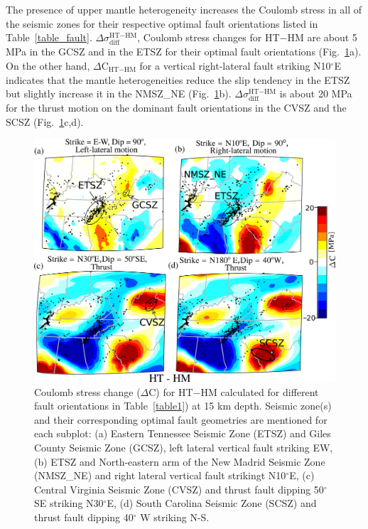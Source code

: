 \documentclass[draft,linenumbers]{agujournal2018}
\begin{document}
%
The presence of upper mantle heterogeneity increases the Coulomb stress in  all of the seismic zones for their respective optimal fault orientations listed in Table~\ref{table_fault}. $\Delta \sigma_{\text{diff}}^{\text{HT}-\text{HM}}$, Coulomb stress changes for HT$-$HM
are about 5 MPa in the GCSZ and in the  ETSZ for their optimal fault orientations (Fig.~\ref{ht_hm_cs}a). On the other hand, $\Delta$C$_{\text{HT}-\text{HM}}$  for a vertical right-lateral fault striking N10$^{\circ}$E 
indicates that the mantle heterogeneities reduce the slip tendency in the ETSZ but slightly increase it in the NMSZ\_NE (Fig.~\ref{ht_hm_cs}b). 
$\Delta \sigma_{\text{diff}}^{\text{HT}-\text{HM}}$ is about 20 MPa for the thrust motion on the dominant fault orientations in the CVSZ and the SCSZ (Fig.~\ref{ht_hm_cs}c,d). 

\begin{figure}[h!]
    \centering
    \includegraphics[width=0.75\linewidth]{figures/cs_ht_hm.png}
    \caption{Coulomb stress change ($\Delta$C) for HT$-$HM calculated for different fault orientations in Table~\ref{table1}) at 15 km depth. Seismic zone(s) and their corresponding optimal fault geometries are mentioned for each subplot: (a) Eastern Tennessee Seismic Zone (ETSZ) and Giles County Seismic Zone (GCSZ), left lateral vertical fault striking EW, (b) ETSZ and North-eastern arm of the New Madrid Seismic Zone (NMSZ\_NE) and right lateral vertical fault strikingt N10$^\circ$E, (c) Central Virginia Seismic Zone (CVSZ) and thrust fault dipping 50$^\circ$ SE striking N30$^\circ$E, (d) South Carolina Seismic Zone (SCSZ) and thrust fault dipping 40$^\circ$ W striking N-S.}	
    \label{ht_hm_cs}
\end{figure}
\end{document}
